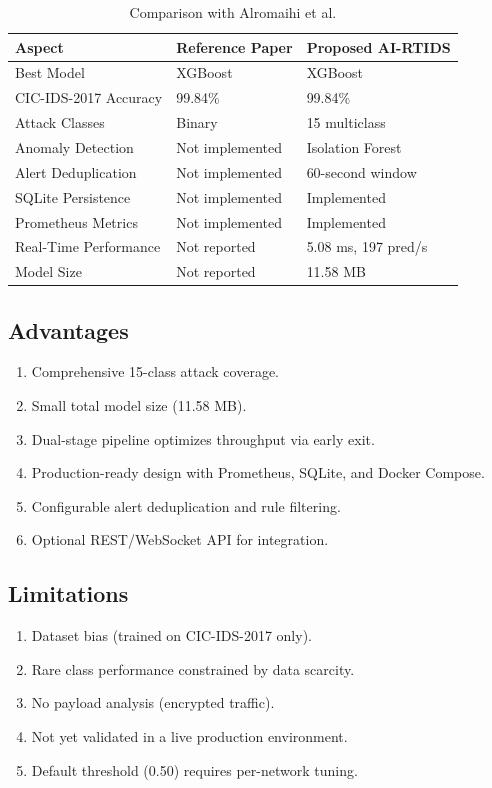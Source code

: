 \documentclass[12pt,a4paper]{article}
\begin{document}
\begin{table}[H]
\centering
\caption{Comparison with Alromaihi et al. \cite{alromaihi2025design}}
\label{tab:reference_comparison}
\begin{tabular}{|p{3cm}|p{4cm}|p{4cm}|}
\hline
\textbf{Aspect} & \textbf{Reference Paper} & \textbf{Proposed AI-RTIDS} \\
\hline
Best Model & XGBoost & XGBoost \\
CIC-IDS-2017 Accuracy & 99.84\% & 99.84\% \\
Attack Classes & Binary & 15 multiclass \\
Anomaly Detection & Not implemented & Isolation Forest \\
Alert Deduplication & Not implemented & 60-second window \\
SQLite Persistence & Not implemented & Implemented \\
Prometheus Metrics & Not implemented & Implemented \\
Real-Time Performance & Not reported & 5.08 ms, 197 pred/s \\
Model Size & Not reported & 11.58 MB \\
\hline
\end{tabular}
\end{table}

\subsection{Advantages}
\begin{enumerate}
    \item Comprehensive 15-class attack coverage.
    \item Small total model size (11.58 MB).
    \item Dual-stage pipeline optimizes throughput via early exit.
    \item Production-ready design with Prometheus, SQLite, and Docker Compose.
    \item Configurable alert deduplication and rule filtering.
    \item Optional REST/WebSocket API for integration.
\end{enumerate}

\subsection{Limitations}
\begin{enumerate}
    \item Dataset bias (trained on CIC-IDS-2017 only).
    \item Rare class performance constrained by data scarcity.
    \item No payload analysis (encrypted traffic).
    \item Not yet validated in a live production environment.
    \item Default threshold (0.50) requires per-network tuning.
\end{enumerate}
\end{document}
